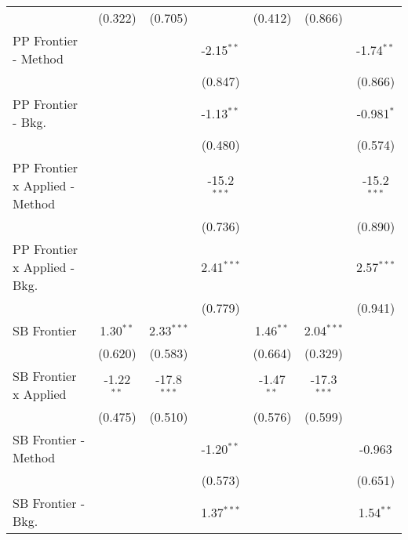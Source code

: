 \begin{tabular}{lcccccc}
                                  & (0.322)      & (0.705)       &               & (0.412)      & (0.866)       &   \\   
   PP Frontier - Method           &              &               & -2.15$^{**}$  &              &               & -1.74$^{**}$\\   
                                  &              &               & (0.847)       &              &               & (0.866)\\   
   PP Frontier - Bkg.             &              &               & -1.13$^{**}$  &              &               & -0.981$^{*}$\\   
                                  &              &               & (0.480)       &              &               & (0.574)\\   
   PP Frontier x Applied - Method &              &               & -15.2$^{***}$ &              &               & -15.2$^{***}$\\   
                                  &              &               & (0.736)       &              &               & (0.890)\\   
   PP Frontier x Applied - Bkg.   &              &               & 2.41$^{***}$  &              &               & 2.57$^{***}$\\   
                                  &              &               & (0.779)       &              &               & (0.941)\\   
   SB Frontier                    & 1.30$^{**}$  & 2.33$^{***}$  &               & 1.46$^{**}$  & 2.04$^{***}$  &   \\   
                                  & (0.620)      & (0.583)       &               & (0.664)      & (0.329)       &   \\   
   SB Frontier x Applied          & -1.22$^{**}$ & -17.8$^{***}$ &               & -1.47$^{**}$ & -17.3$^{***}$ &   \\   
                                  & (0.475)      & (0.510)       &               & (0.576)      & (0.599)       &   \\   
   SB Frontier - Method           &              &               & -1.20$^{**}$  &              &               & -0.963\\   
                                  &              &               & (0.573)       &              &               & (0.651)\\   
   SB Frontier - Bkg.             &              &               & 1.37$^{***}$  &              &               & 1.54$^{**}$\\   

\end{tabular}
